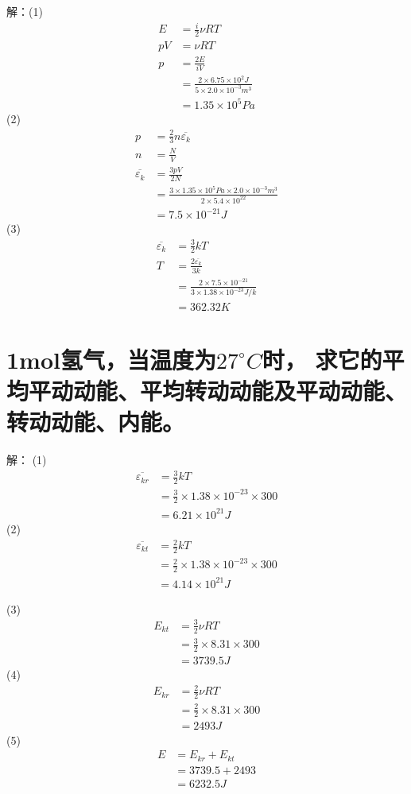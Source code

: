 \documentclass[lang=cn]{elegantpaper}
\begin{document}
解：(1)\[
  \begin{align}
    E &= \frac{i}{2} \nu RT \\
    pV &= \nu RT\\
    p &= \frac{2E}{iV} \\
    &= \frac{2 \times 6.75 \times 10^2J}{5 \times 2.0 \times 10^{-3}m^3} \\
    &= 1.35 \times 10^{5} Pa
  \end{align} 
\]
(2)\[
  \begin{align}
    p &= \frac{2}{3}n \overline{\varepsilon_k} \\
    n &= \frac{N}{V}\\
    \overline{\varepsilon_k} &= \frac{3pV}{2N} \\
    &= \frac{3 \times 1.35 \times 10^5 Pa \times 2.0 \times 10^{-3} m^3 }{2 \times 5.4 \times 10^{22}}\\
    &= 7.5\times 10^{-21}J
  \end{align}
\]
(3)\[
  \begin{align}
    \overline{\varepsilon_k}&= \frac{3}{2}kT\\
    T &= \frac{2\overline{\varepsilon_k}}{3k}\\
    &= \frac{2 \times 7.5\times 10^{-21}}{3 \times 1.38 \times 10^{-23}J/k}\\
    &= 362.32K
  \end{align}
    \]

\section{1mol氢气，当温度为\(27^\circ C\)时，
求它的平均平动动能、平均转动动能及平动动能、转动动能、内能。}
解：
(1)
\[
  \begin{align}
  \overline{\varepsilon_{kr}} &= \frac{3}{2}kT\\
  &=\frac{3}{2} \times 1.38 \times 10^{-23} \times 300\\
  &=6.21 \times 10^{21}J
  \end{align}
\]
(2)
\[
  \begin{align}
    \overline{\varepsilon_{kt}} &= \frac{2}{2}kT\\
  &=\frac{2}{2} \times 1.38 \times 10^{-23} \times 300\\
  &=4.14 \times 10^{21}J
  \end{align}
\]

(3)\[
  \begin{align}
    E_{kt} &= \frac{3}{2} \nu RT\\
  &=\frac{3}{2} \times 8.31 \times 300\\
  &=3739.5J
  \end{align}
  \]
  (4)
  \[
  \begin{align}
    E_{kr} &= \frac{2}{2} \nu RT\\
  &=\frac{2}{2} \times 8.31 \times 300\\
  &=2493J
  \end{align}
  \]
  (5)
  \[
  \begin{align}
    E &= E_{kr} + E_{kt}\\
  &=3739.5 + 2493\\
  &=6232.5J
  \end{align}
  \]
\end{document}
